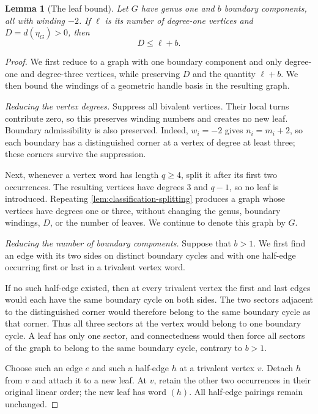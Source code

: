\documentclass[11pt]{amsart}
\theoremstyle{definition}
\theoremstyle{plain}
\newtheorem{lemma}[lemma]{Lemma}
\theoremstyle{definition}
\theoremstyle{definition}
\begin{document}
\begin{lemma}[The leaf bound]
\label{lem:classification-leaf-bound}
Let $G$ have genus one and $b$ boundary components, all with winding
$-2$.  If $\ell$ is its number of degree-one vertices and
$D=d(\eta_G)>0$, then
\begin{equation}
\label{eq:classification-leaf-bound}
 D\leq\ell+b.
\end{equation}
\end{lemma}
\begin{proof}
We first reduce to a graph with one boundary component
and only degree-one and degree-three vertices, while
preserving $D$ and the quantity $\ell+b$.
We then bound the windings of a geometric handle basis
in the resulting graph.

\smallskip
\noindent\emph{Reducing the vertex degrees.}
Suppress all bivalent vertices.
Their local turns contribute zero, so this preserves
winding numbers and creates no new leaf.
Boundary admissibility is also preserved.
Indeed, $w_i=-2$ gives $n_i=m_i+2$, so each boundary
has a distinguished corner at a vertex of degree at
least three; these corners survive the suppression.

Next, whenever a vertex word has length $q\geq4$,
split it after its first two occurrences.
The resulting vertices have degrees $3$ and $q-1$,
so no leaf is introduced.
Repeating \cref{lem:classification-splitting} produces
a graph whose vertices have degrees one or three,
without changing the genus, boundary windings, $D$,
or the number of leaves.
We continue to denote this graph by $G$.

\smallskip
\noindent\emph{Reducing the number of boundary components.}
Suppose that $b>1$.
We first find an edge with its two sides on distinct
boundary cycles and with one half-edge occurring first
or last in a trivalent vertex word.

If no such half-edge existed, then at every trivalent
vertex the first and last edges would each have the
same boundary cycle on both sides.
The two sectors adjacent to the distinguished corner
would therefore belong to the same boundary cycle as
that corner.
Thus all three sectors at the vertex would belong
to one boundary cycle.
A leaf has only one sector, and connectedness would
then force all sectors of the graph to belong to the
same boundary cycle, contrary to $b>1$.

Choose such an edge $e$ and such a half-edge $h$ at
a trivalent vertex $v$.
Detach $h$ from $v$ and attach it to a new leaf.
At $v$, retain the other two occurrences in their
original linear order; the new leaf has word $(h)$.
All half-edge pairings remain unchanged.


\end{proof}
\end{document}
